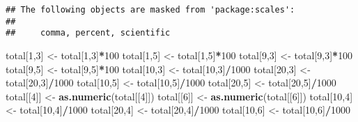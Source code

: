 \documentclass[]{article}
\newenvironment{Shaded}{\begin{snugshade}}{\end{snugshade}}
\newcommand{\KeywordTok}[1]{\textcolor[rgb]{0.13,0.29,0.53}{\textbf{#1}}}
\newcommand{\DecValTok}[1]{\textcolor[rgb]{0.00,0.00,0.81}{#1}}
\newcommand{\StringTok}[1]{\textcolor[rgb]{0.31,0.60,0.02}{#1}}
\newcommand{\OperatorTok}[1]{\textcolor[rgb]{0.81,0.36,0.00}{\textbf{#1}}}
\newcommand{\NormalTok}[1]{#1}
\begin{document}
\begin{verbatim}
## The following objects are masked from 'package:scales':
## 
##     comma, percent, scientific
\end{verbatim}

\begin{Shaded}
\begin{Highlighting}[]
\NormalTok{total[}\DecValTok{1}\NormalTok{,}\DecValTok{3}\NormalTok{] <-}\StringTok{ }\NormalTok{total[}\DecValTok{1}\NormalTok{,}\DecValTok{3}\NormalTok{]}\OperatorTok{*}\DecValTok{100}
\NormalTok{total[}\DecValTok{1}\NormalTok{,}\DecValTok{5}\NormalTok{] <-}\StringTok{ }\NormalTok{total[}\DecValTok{1}\NormalTok{,}\DecValTok{5}\NormalTok{]}\OperatorTok{*}\DecValTok{100}
\NormalTok{total[}\DecValTok{9}\NormalTok{,}\DecValTok{3}\NormalTok{] <-}\StringTok{ }\NormalTok{total[}\DecValTok{9}\NormalTok{,}\DecValTok{3}\NormalTok{]}\OperatorTok{*}\DecValTok{100}
\NormalTok{total[}\DecValTok{9}\NormalTok{,}\DecValTok{5}\NormalTok{] <-}\StringTok{ }\NormalTok{total[}\DecValTok{9}\NormalTok{,}\DecValTok{5}\NormalTok{]}\OperatorTok{*}\DecValTok{100}
\NormalTok{total[}\DecValTok{10}\NormalTok{,}\DecValTok{3}\NormalTok{] <-}\StringTok{ }\NormalTok{total[}\DecValTok{10}\NormalTok{,}\DecValTok{3}\NormalTok{]}\OperatorTok{/}\DecValTok{1000}
\NormalTok{total[}\DecValTok{20}\NormalTok{,}\DecValTok{3}\NormalTok{] <-}\StringTok{ }\NormalTok{total[}\DecValTok{20}\NormalTok{,}\DecValTok{3}\NormalTok{]}\OperatorTok{/}\DecValTok{1000}
\NormalTok{total[}\DecValTok{10}\NormalTok{,}\DecValTok{5}\NormalTok{] <-}\StringTok{ }\NormalTok{total[}\DecValTok{10}\NormalTok{,}\DecValTok{5}\NormalTok{]}\OperatorTok{/}\DecValTok{1000}
\NormalTok{total[}\DecValTok{20}\NormalTok{,}\DecValTok{5}\NormalTok{] <-}\StringTok{ }\NormalTok{total[}\DecValTok{20}\NormalTok{,}\DecValTok{5}\NormalTok{]}\OperatorTok{/}\DecValTok{1000}
\NormalTok{total[[}\DecValTok{4}\NormalTok{]] <-}\StringTok{ }\KeywordTok{as.numeric}\NormalTok{(total[[}\DecValTok{4}\NormalTok{]])}
\NormalTok{total[[}\DecValTok{6}\NormalTok{]] <-}\StringTok{ }\KeywordTok{as.numeric}\NormalTok{(total[[}\DecValTok{6}\NormalTok{]])}
\NormalTok{total[}\DecValTok{10}\NormalTok{,}\DecValTok{4}\NormalTok{] <-}\StringTok{ }\NormalTok{total[}\DecValTok{10}\NormalTok{,}\DecValTok{4}\NormalTok{]}\OperatorTok{/}\DecValTok{1000}
\NormalTok{total[}\DecValTok{20}\NormalTok{,}\DecValTok{4}\NormalTok{] <-}\StringTok{ }\NormalTok{total[}\DecValTok{20}\NormalTok{,}\DecValTok{4}\NormalTok{]}\OperatorTok{/}\DecValTok{1000}
\NormalTok{total[}\DecValTok{10}\NormalTok{,}\DecValTok{6}\NormalTok{] <-}\StringTok{ }\NormalTok{total[}\DecValTok{10}\NormalTok{,}\DecValTok{6}\NormalTok{]}\OperatorTok{/}\DecValTok{1000}

\end{Highlighting}
\end{Shaded}
\end{document}
